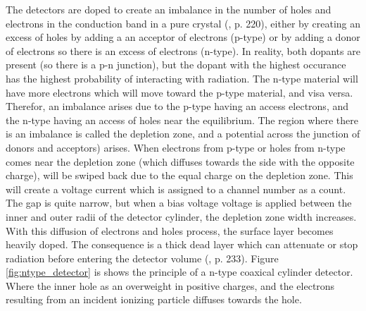 \noindent 
The detectors are doped to create an imbalance in the number of holes and electrons in the conduction band in a pure crystal (\cite{Leo1994}, p. 220), either by creating an excess of holes by adding a an acceptor of electrons (p-type) or by adding a donor of electrons so there is an excess of electrons (n-type). In reality, both dopants are present (so there is a p-n junction), but the dopant with the highest occurance has the highest probability of interacting with radiation. The n-type material will have more electrons which will move toward the p-type material, and visa versa. Therefor, an imbalance arises due to the p-type having an access electrons, and the n-type having an access of holes near the equilibrium. The region where there is an imbalance is called the depletion zone, and a potential across the junction of donors and acceptors) arises. When electrons from p-type or holes from n-type comes near the depletion zone (which diffuses towards the side with the opposite charge), will be swiped back due to the equal charge on the depletion zone. This will create a voltage current which is assigned to a channel number as a count. The gap is quite narrow, but when a bias voltage voltage is applied between the inner and outer radii of the detector cylinder, the depletion zone width increases. With this diffusion of electrons and holes process, the surface layer becomes heavily doped. The consequence is a thick dead layer which can attenuate or stop radiation before entering the detector volume (\cite{Leo1994}, p. 233).  Figure \ref{fig:ntype_detector} is shows the principle of a n-type coaxical cylinder detector. Where the inner hole as an overweight in positive charges, and the electrons resulting from an incident ionizing particle diffuses towards the hole. \\


